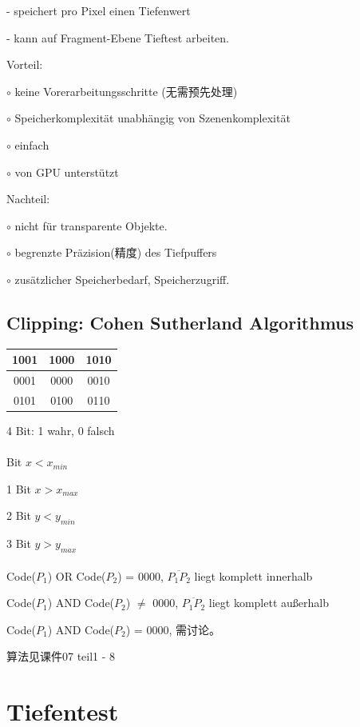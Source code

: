 \documentclass[fleqn]{article}
\begin{document}
- speichert pro Pixel einen Tiefenwert

- kann auf Fragment-Ebene Tieftest arbeiten.

Vorteil:

$\circ$ keine Vorerarbeitungsschritte (无需预先处理)

$\circ$ Speicherkomplexität unabhängig von Szenenkomplexität

$\circ$ einfach

$\circ$ von GPU unterstützt

Nachteil:

$\circ$ nicht für transparente Objekte.

$\circ$ begrenzte Präzision(精度) des Tiefpuffers

$\circ$ zusätzlicher Speicherbedarf, Speicherzugriff.

\subsection{Clipping: Cohen Sutherland Algorithmus}

\begin{center}
    \begin{tabular}{c|c|c}
        1001&1000&1010\\
        \hline
        0001&0000&0010\\
        \hline
        0101&0100&0110
    \end{tabular}
\end{center}

4 Bit: 1 wahr, 0 falsch
\\
\\
 Bit $x<x_{min}$

1 Bit $x>x_{max}$

2 Bit $y<y_{min}$

3 Bit $y>y_{max}$
\\
\\
\indent Code($P_1$) OR Code($P_2$) = 0000, $\overline{P_1P_2}$ liegt komplett innerhalb

Code($P_1$) AND Code($P_2$) $\neq$ 0000, $\overline{P_1P_2}$ liegt komplett außerhalb

Code($P_1$) AND Code($P_2$) = 0000, 需讨论。

算法见课件07 teil1 - 8



\section{Tiefentest}
\end{document}
